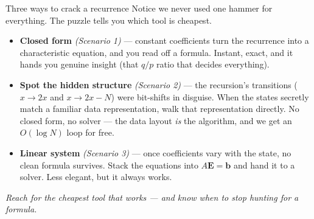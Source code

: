 \documentclass[aspectratio=169,10pt]{beamer}
\newif\ifkick \kickfalse
\newcommand{\kick}[1]{\def\thekicker{#1}\kicktrue}
\begin{document}
\begin{frame}[t]{Three ways to crack a recurrence}
\kick{Step back \ \textbullet\ \ the method}
\small Notice we never used one hammer for everything. The puzzle tells you which tool is cheapest.
\vspace{0.8em}
\begin{itemize}\setlength\itemsep{12pt}
  \item[\textcolor{cTeal}{\textbf{1}}] \textbf{Closed form} \textit{(Scenario 1)} --- constant coefficients turn the recurrence into a characteristic equation, and you read off a formula. Instant, exact, and it hands you genuine insight (that $q/p$ ratio that decides everything).
  \item[\textcolor{cPurple}{\textbf{2}}] \textbf{Spot the hidden structure} \textit{(Scenario 2)} --- the recursion's transitions ($x\!\to\!2x$ and $x\!\to\!2x{-}N$) were bit-shifts in disguise. When the states secretly match a familiar data representation, walk that representation directly. No closed form, no solver --- the data layout \emph{is} the algorithm, and we get an $O(\log N)$ loop for free.
  \item[\textcolor{cAmber}{\textbf{3}}] \textbf{Linear system} \textit{(Scenario 3)} --- once coefficients vary with the state, no clean formula survives. Stack the equations into $A\mathbf{E}=\mathbf{b}$ and hand it to a solver. Less elegant, but it always works.
\end{itemize}
\vspace{0.4em}
\centering\footnotesize\textit{\textcolor{cSlate}{Reach for the cheapest tool that works --- and know when to stop hunting for a formula.}}
\end{frame}
\end{document}
